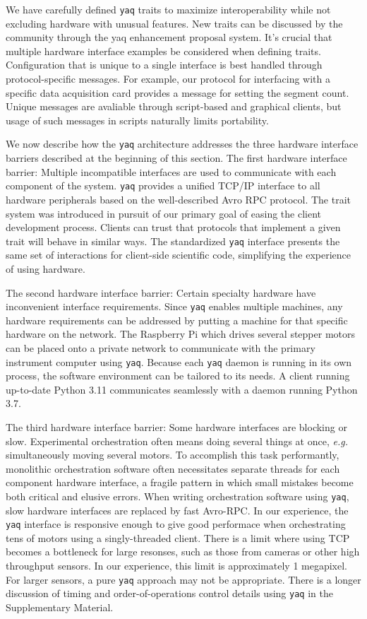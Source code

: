 \documentclass[aip, amsmath, amssymb, reprint,]{revtex4-2}
\newcommand\yaq{\texttt{yaq}}
\begin{document}
We have carefully defined \yaq{} traits to maximize interoperability while not excluding hardware with unusual features.
New traits can be discussed by the community through the yaq enhancement proposal system.
It's crucial that multiple hardware interface examples be considered when defining traits.
Configuration that is unique to a single interface is best handled through protocol-specific messages.
For example, our protocol for interfacing with a specific data acquisition card provides a message for setting the segment count.
Unique messages are avaliable through script-based and graphical clients, but usage of such messages in scripts naturally limits portability.

We now describe how the \yaq{} architecture addresses the three hardware interface barriers described at the beginning of this section.
The first hardware interface barrier: Multiple incompatible interfaces are used to communicate with each component of the system. %
\yaq{} provides a unified TCP/IP interface to all hardware peripherals based on the well-described Avro RPC protocol.
The trait system was introduced in pursuit of our primary goal of easing the client development process.
Clients can trust that protocols that implement a given trait will behave in similar ways.
The standardized \yaq{} interface presents the same set of interactions for client-side scientific code, simplifying the experience of using hardware.

The second hardware interface barrier: Certain specialty hardware have inconvenient interface requirements.
Since \yaq{} enables multiple machines, any hardware requirements can be addressed by putting a machine for that specific hardware on the network.
The Raspberry Pi which drives several stepper motors can be placed onto a private network to communicate with the primary instrument computer using \yaq{}.
Because each \yaq{} daemon is running in its own process, the software environment can be tailored to its needs.
A client running up-to-date Python 3.11 communicates seamlessly with a daemon running Python 3.7.

The third hardware interface barrier: Some hardware interfaces are blocking or slow.
Experimental orchestration often means doing several things at once, \textit{e.g.} simultaneously moving several motors.
To accomplish this task performantly, monolithic orchestration software often necessitates separate threads for each component hardware interface, a fragile pattern in which small mistakes become both critical and elusive errors.
When writing orchestration software using \yaq{}, slow hardware interfaces are replaced by fast Avro-RPC.
In our experience, the \yaq{} interface is responsive enough to give good performace when orchestrating tens of motors using a singly-threaded client.
There is a limit where using TCP becomes a bottleneck for large resonses, such as those from cameras or other high throughput sensors.
In our experience, this limit is approximately 1 megapixel.
For larger sensors, a pure \yaq{} approach may not be appropriate.
There is a longer discussion of timing and order-of-operations control details using \yaq{} in the Supplementary Material.
\end{document}
